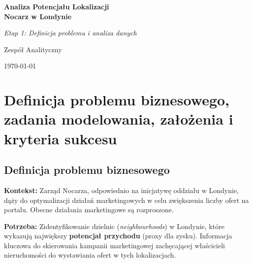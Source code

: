 \documentclass[a4paper,11pt]{article}
\begin{document}
\begin{titlepage}
  \begin{center}
    \vspace*{2cm}
    \vfill
    {\Huge\bfseries Analiza Potencjału Lokalizacji\\
    Nocarz w Londynie\par}
    \vspace{1cm}
    {\large\itshape Etap 1: Definicja problemu i analiza danych\par}
    \vfill
    {\large Zespół Analityczny\par}
    \vspace{1cm}
    {\large \today\par}
  \end{center}
\end{titlepage}

\tableofcontents
\clearpage

\section{Definicja problemu biznesowego, zadania modelowania, założenia i kryteria sukcesu}

\subsection{Definicja problemu biznesowego}
\begin{tcolorbox}[colback=blue!5,colframe=blue!50!black,title=Problem biznesowy]
\textbf{Kontekst:} Zarząd Nocarza, odpowiednio na inicjatywę oddziału w Londynie, dąży do optymalizacji działań marketingowych w celu zwiększenia liczby ofert na portalu. Obecne działania marketingowe są rozproszone.

\textbf{Potrzeba:} Zidentyfikowanie dzielnic (\emph{neighbourhoods}) w Londynie, które wykazują największy \textbf{potencjał przychodu} (proxy dla zysku). Informacja kluczowa do skierowania kampanii marketingowej zachęcającej właścicieli nieruchomości do wystawiania ofert w tych lokalizacjach.
\end{tcolorbox}
\end{document}

